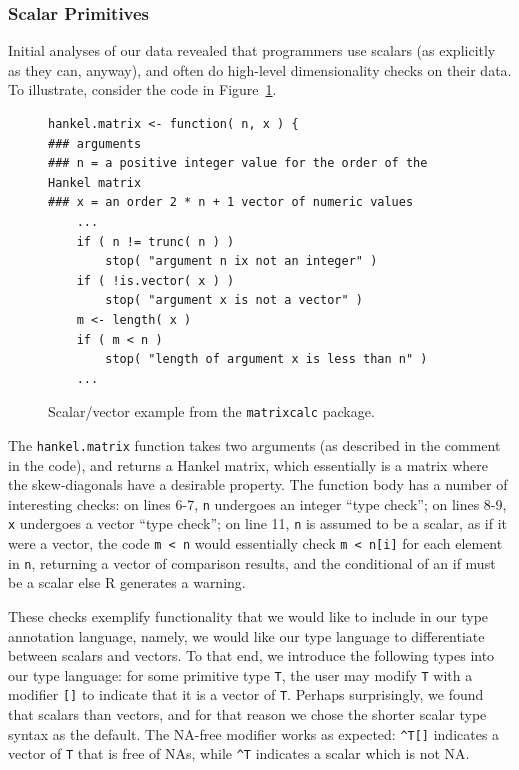 \documentclass[acmsmall,review,anonymous]{acmart}\settopmatter{printfolios=true,printccs=false,printacmref=false}
\newcommand{\code}[1]{{\lstinline[style=Rin]!#1!}\xspace}
\begin{document}
%
%
\subsubsection{Scalar Primitives}

Initial analyses of our data revealed that programmers  use scalars (as explicitly as they can, anyway), and often do high-level dimensionality checks on their data.
To illustrate, consider the code in Figure~\ref{fig:scalar-vector-example}.

\begin{figure}[htbp]
\begin{center}

\begin{lstlisting}
hankel.matrix <- function( n, x ) { 
### arguments
### n = a positive integer value for the order of the Hankel matrix
### x = an order 2 * n + 1 vector of numeric values
    ...
    if ( n != trunc( n ) )
        stop( "argument n ix not an integer" )
    if ( !is.vector( x ) )
        stop( "argument x is not a vector" )
    m <- length( x )
    if ( m < n )
        stop( "length of argument x is less than n" )
    ...
\end{lstlisting}

\caption{Scalar/vector example from the \code{matrixcalc} package.}
\label{fig:scalar-vector-example}
\end{center}
\end{figure}

The \code{hankel.matrix} function takes two arguments (as described in the comment in the code), and returns a Hankel matrix, which essentially is a matrix where the skew-diagonals have a desirable property.
The function body has a number of interesting checks:
on lines 6-7, \code{n} undergoes an integer ``type check'';
on lines 8-9, \code{x} undergoes a vector ``type check'';
on line 11, \code{n} is assumed to be a scalar, as if it were a vector, the code \code{m < n} would essentially check \code{m < n[i]} for each element in \code{n}, returning a vector of comparison results, and the conditional of an if must be a scalar else R generates a warning.

These checks exemplify functionality that we would like to include in our type annotation language, namely, we would like our type language to differentiate between scalars and vectors.
To that end, we introduce the following types into our type language:
for some primitive type \code{T}, the user may modify \code{T} with a modifier \code{[]} to indicate that it is a vector of \code{T}.
Perhaps surprisingly, we found that scalars  than vectors, and for that reason we chose the shorter scalar type syntax as the default.
The NA-free modifier works as expected: \code{^T[]} indicates a vector of \code{T} that is free of NAs, while \code{^T} indicates a scalar which is not NA.
 
\end{document}
